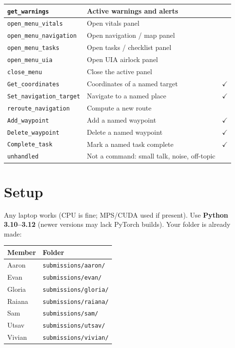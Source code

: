 \documentclass[11pt]{article}
\begin{document}
\begin{center}
\begin{tabular}{@{}llc@{}}
\texttt{get\_warnings} & Active warnings and alerts & \\
\midrule
\texttt{open\_menu\_vitals} & Open vitals panel & \\
\texttt{open\_menu\_navigation} & Open navigation / map panel & \\
\texttt{open\_menu\_tasks} & Open tasks / checklist panel & \\
\texttt{open\_menu\_uia} & Open UIA airlock panel & \\
\texttt{close\_menu} & Close the active panel & \\
\midrule
\texttt{Get\_coordinates} & Coordinates of a named target & $\checkmark$ \\
\texttt{Set\_navigation\_target} & Navigate to a named place & $\checkmark$ \\
\texttt{reroute\_navigation} & Compute a new route & \\
\texttt{Add\_waypoint} & Add a named waypoint & $\checkmark$ \\
\texttt{Delete\_waypoint} & Delete a named waypoint & $\checkmark$ \\
\texttt{Complete\_task} & Mark a named task complete & $\checkmark$ \\
\midrule
\texttt{unhandled} & Not a command: small talk, noise, off-topic & \\
\bottomrule
\end{tabular}
\end{center}

\newpage
\section{Setup}

Any laptop works (CPU is fine; MPS/CUDA used if present). Use
\textbf{Python 3.10--3.12} (newer versions may lack PyTorch builds). Your
folder is already made:

\begin{center}
\begin{tabular}{@{}ll@{}}
\toprule
Member & Folder \\
\midrule
Aaron  & \texttt{submissions/aaron/} \\
Evan   & \texttt{submissions/evan/} \\
Gloria & \texttt{submissions/gloria/} \\
Raiana & \texttt{submissions/raiana/} \\
Sam    & \texttt{submissions/sam/} \\
Utsav  & \texttt{submissions/utsav/} \\
Vivian & \texttt{submissions/vivian/} \\
\bottomrule
\end{tabular}
\end{center}
\end{document}
